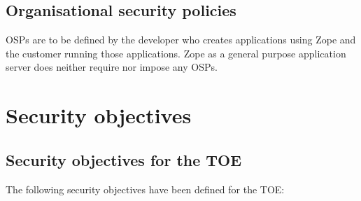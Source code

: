 \documentclass[12pt,english]{scrbook}
\begin{document}



\section{Organisational security policies}

OSPs are to be defined by the developer who creates applications using Zope and
the customer running those applications.  Zope as a general purpose application
server does neither require nor impose any OSPs.





\chapter{Security objectives}





\section{Security objectives for the TOE}

The following security objectives have been defined for the TOE:
\end{document}
